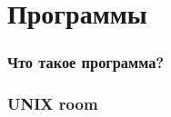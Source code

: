 \documentclass[t,aspectratio=169]{beamer}
\begin{document}
\section{Программы}
\begin{frame}
    \frametitle{Что такое программа?}
\end{frame}

\begin{frame}
    \frametitle{UNIX room}
    \begin{figure}
        \begin{centering}
        \end{centering}
    \end{figure}
\end{frame}
\end{document}
